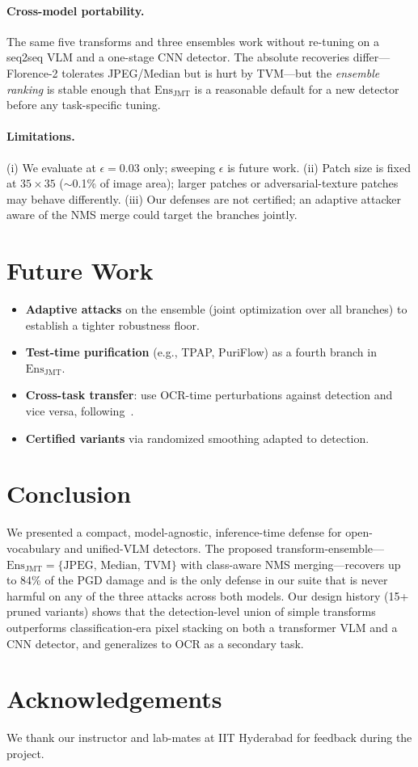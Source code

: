 \documentclass[10pt,twocolumn,letterpaper]{article}
\begin{document}
\paragraph{Cross-model portability.}
The same five transforms and three ensembles work without re-tuning on a seq2seq VLM and a one-stage CNN detector. The absolute recoveries differ---Florence-2 tolerates JPEG/Median but is hurt by TVM---but the \emph{ensemble ranking} is stable enough that $\mathrm{Ens}_{\text{JMT}}$ is a reasonable default for a new detector before any task-specific tuning.

\paragraph{Limitations.}
(i) We evaluate at $\epsilon{=}0.03$ only; sweeping $\epsilon$ is future work. (ii) Patch size is fixed at $35{\times}35$ ($\sim$0.1\% of image area); larger patches or adversarial-texture patches may behave differently. (iii) Our defenses are not certified; an adaptive attacker aware of the NMS merge could target the branches jointly.

\section{Future Work}
\begin{itemize}
\itemsep -0.25em
\item \textbf{Adaptive attacks} on the ensemble (joint optimization over all branches) to establish a tighter robustness floor.
\item \textbf{Test-time purification} (e.g., TPAP, PuriFlow) as a fourth branch in $\mathrm{Ens}_{\text{JMT}}$.
\item \textbf{Cross-task transfer}: use OCR-time perturbations against detection and vice versa, following~\cite{wang2024oneobjectmultiplelies}.
\item \textbf{Certified variants} via randomized smoothing adapted to detection.
\end{itemize}

\section{Conclusion}
We presented a compact, model-agnostic, inference-time defense for open-vocabulary and unified-VLM detectors. The proposed transform-ensemble---$\mathrm{Ens}_{\text{JMT}}=\{\text{JPEG, Median, TVM}\}$ with class-aware NMS merging---recovers up to 84\% of the PGD damage and is the only defense in our suite that is never harmful on any of the three attacks across both models. Our design history (15+ pruned variants) shows that the detection-level union of simple transforms outperforms classification-era pixel stacking on both a transformer VLM and a CNN detector, and generalizes to OCR as a secondary task.

\section*{Acknowledgements}
We thank our instructor and lab-mates at IIT Hyderabad for feedback during the project.

{\small


}
\end{document}
